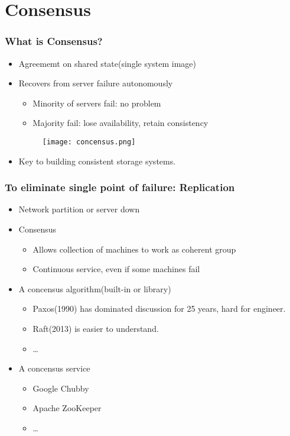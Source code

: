\section{Consensus}

\begin{frame}
    \frametitle{What is Consensus?}
    \begin{itemize}
        \item Agreememt on shared state(single system image)
        \item Recovers from server failure autonomously
            \begin{itemize}
                \item Minority of servers fail: no problem
                \item Majority fail: lose availability, retain consistency
            \end{itemize}
        \begin{figure}
            \centering
            \texttt{[image: concensus.png]}
        \end{figure}
        \item Key to building consistent storage systems.
    \end{itemize}
\end{frame}

\begin{frame}
    \frametitle{To eliminate single point of failure: Replication}
    \begin{itemize}
        \item Network partition or server down
        \item Consensus
            \begin{itemize}
                \item Allows collection of machines to work as coherent group
                \item Continuous service, even if some machines fail
            \end{itemize}
        \item A concensus algorithm(built-in or library)
            \begin{itemize}
                \item Paxos(1990) has dominated discussion for 25 years, hard for engineer.
                \item Raft(2013) is easier to understand.
                \item \ldots
            \end{itemize}
        \item A concensus service
            \begin{itemize}
                \item Google Chubby
                \item Apache ZooKeeper
                \item \ldots
            \end{itemize}
    \end{itemize}
\end{frame}

